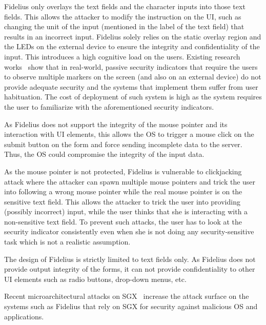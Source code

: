\begin{mylist}
\item Fidelius only overlays the text fields and the character inputs into those text fields. This allows the attacker to modify the instruction on the UI, such as changing the unit of the input (mentioned in the label of the text field) that results in an incorrect input. Fidelius solely relies on the static overlay region and the LEDs on the external device to ensure the integrity and confidentiality of the input. This introduces a high cognitive load on the users. Existing research works~\cite{egelman2008you,sobey2008exploring} show that in real-world, passive security indicators that require the users to observe multiple markers on the screen (and also on an external device) do not provide adequate security and the systems that implement them suffer from user habituation. The cost of deployment of such system is high as the system requires the user to familiarize with the aforementioned security indicators.
\item As Fidelius does not support the integrity of the mouse pointer and its interaction with UI elements, this allows the OS to trigger a mouse click on the submit button on the form and force sending incomplete data to the server. Thus, the OS could compromise the integrity of the input data. 
\item As the mouse pointer is not protected, Fidelius is vulnerable to clickjacking attack where the attacker can spawn multiple mouse pointers and trick the user into following a wrong mouse pointer while the real mouse pointer is on the sensitive text field. This allows the attacker to trick the user into providing (possibly incorrect) input, while the user thinks that she is interacting with a non-sensitive text field. To prevent such attacks, the user has to look at the security indicator consistently even when she is not doing any security-sensitive task which is not a realistic assumption. 
\item The design of Fidelius is strictly limited to text fields only. As Fidelius does not provide output integrity of the forms, it can not provide confidentiality to other UI elements such as radio buttons, drop-down menus, etc.
\item Recent microarchitectural attacks on SGX~\cite{van2018foreshadow} increase the attack surface on the systems such as Fidelius that rely on SGX for security against malicious OS and applications. 
\end{mylist}

